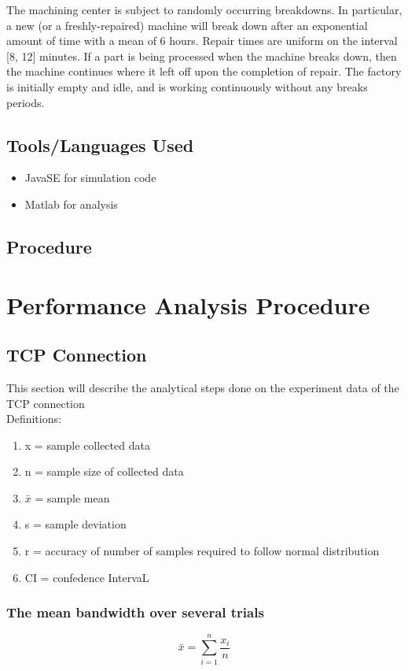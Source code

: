 \documentclass[aps,letterpaper,10pt]{revtex4}
\begin{document}
The machining center is subject to randomly occurring breakdowns. In particular, a new (or a
freshly-repaired) machine will break down after an exponential amount of time with a mean of 6 hours. Repair times are uniform on the interval [8, 12] minutes. If a part is being processed when the machine breaks down, then the machine continues where it left off upon the completion of repair. The factory is initially empty and idle, and is working continuously without any breaks periods.
\subsection{Tools/Languages Used}
    \begin{itemize}
        \item{JavaSE for simulation code}
        \item{Matlab for analysis}
    \end{itemize}
\subsection{Procedure}

\newpage
\section{Performance Analysis Procedure}
    \subsection{TCP Connection}
This section will describe the analytical steps done on the experiment data of the TCP connection\\
Definitions:
    \begin{enumerate}
        \item x = sample collected data
        \item n = sample size of collected data
        \item $\bar{x}$ = sample mean 
        \item s = sample deviation 
        \item r = accuracy of number of samples required to follow normal distribution 
        \item CI = confedence IntervaL 
    \end{enumerate}
    \subsubsection{The mean bandwidth over several trials}
            \[
            \bar{x} = \sum_{i=1}^n{\frac{x_{i}}{n}}
            \]
\end{document}
